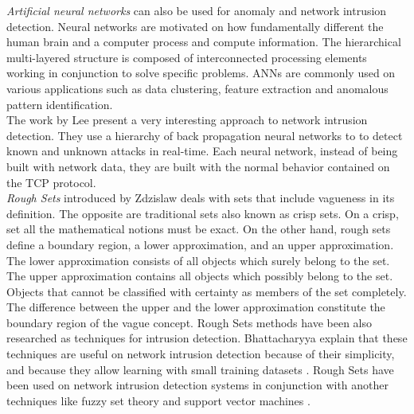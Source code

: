\begin{itemize}
\textit{Artificial neural networks} can also be used for anomaly and network intrusion detection. Neural networks are motivated on how fundamentally different the human brain and a computer process and compute information. The hierarchical multi-layered structure is composed of interconnected processing elements working in conjunction to solve specific problems. ANNs are commonly used on various applications such as data clustering, feature extraction and anomalous pattern identification.\\
The work by Lee \etAl \cite{935046} present a very interesting approach to network intrusion detection. They use a hierarchy of back propagation neural networks to to detect known and unknown attacks in real-time. Each neural network, instead of being built with network data, they are built with the normal behavior contained on the TCP protocol.\\

\textit{Rough Sets} introduced by Zdzislaw \cite{Pawlak199748} deals with sets that include vagueness in its definition. The opposite are traditional sets also known as crisp sets. On a crisp, set all the mathematical notions must be exact. On the other hand, rough sets define a boundary region, a lower approximation, and an upper approximation. The lower approximation consists of all objects which surely belong to the set. The upper approximation contains all objects which possibly belong to the set. Objects that cannot be classified with certainty as members of the set completely. The difference between the upper and the lower approximation constitute the boundary region of the vague concept.
Rough Sets  methods have been also researched as techniques for intrusion detection. Bhattacharyya \etAl explain that these techniques are useful on network intrusion detection because of their simplicity, and because they allow learning with small training datasets \cite{Bhattacharyya:2013:NAD:2505468}. Rough Sets have been used on network intrusion detection systems in conjunction with another techniques like fuzzy set theory \cite{4509827} and support vector machines \cite{5176039}.\\



\end{itemize}
